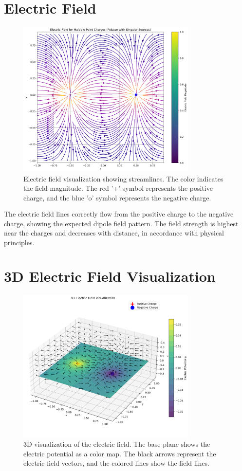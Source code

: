 \documentclass[12pt,a4paper]{report}
\begin{document}
	\section{Electric Field}
	\begin{figure}[H]
		\centering
		\includegraphics[width=0.8\textwidth]{poisson_electric_field.png}
		\caption{Electric field visualization showing streamlines. The color indicates the field magnitude. The red '+' symbol represents the positive charge, and the blue 'o' symbol represents the negative charge.}
	\end{figure}
	
	The electric field lines correctly flow from the positive charge to the negative charge, showing the expected dipole field pattern. The field strength is highest near the charges and decreases with distance, in accordance with physical principles.
	
	\section{3D Electric Field Visualization}
	\begin{figure}[H]
		\centering
		\includegraphics[width=0.8\textwidth]{electric_field_3d.png}
		\caption{3D visualization of the electric field. The base plane shows the electric potential as a color map. The black arrows represent the electric field vectors, and the colored lines show the field lines.}
	\end{figure}
	
\end{document}
